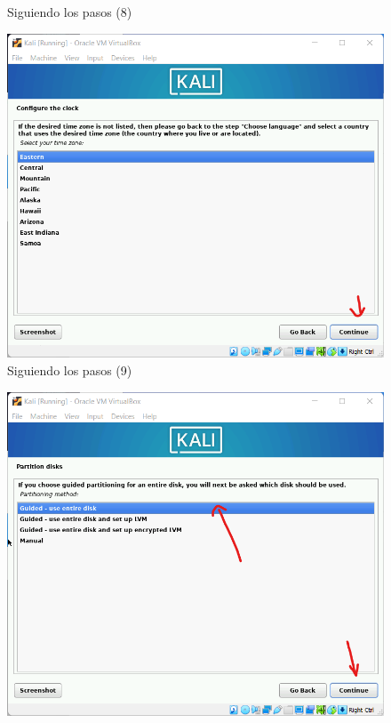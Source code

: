 \documentclass[stu, 12pt, letterpaper, donotrepeattitle, floatsintext, natbib, helv]{apa7}
\begin{document}
\begin{enumerate}
\begin{figure} [H]
        \caption{Siguiendo los pasos (8)}
        \label{fig:Inst8}
    \end{figure}
    \begin{figure} [H]
        \includegraphics[width = 1\textwidth]{Installation9.png}
        \caption{Siguiendo los pasos (9)}
        \label{fig:Inst9}
    \end{figure}
    \begin{figure} [H]
        \includegraphics[width = 1\textwidth]{Installation10.png}

\end{figure}
\end{enumerate}
\end{document}
